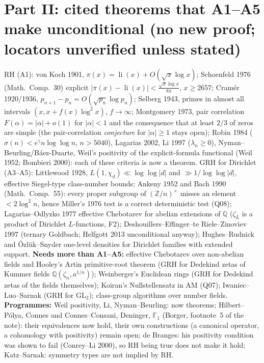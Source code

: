 \documentclass[11pt]{article}
\theoremstyle{definition}\newtheorem{definition}[theorem]{Definition}\newtheorem{remark}[theorem]{Remark}
\begin{document}
\section{Part II: cited theorems that A1--A5 make unconditional (no new proof; locators unverified unless stated)}
RH (A1): von Koch 1901, $\pi(x)=\operatorname{li}(x)+O(\sqrt x\log x)$; Schoenfeld 1976 (Math.\ Comp.\ 30) explicit
$|\pi(x)-\operatorname{li}(x)|<\frac{\sqrt x\log x}{8\pi}$, $x\ge2657$; Cram\'er 1920/1936, $p_{n+1}-p_n=O(\sqrt{p_n}\log p_n)$;
Selberg 1943, primes in almost all intervals $(x,x+f(x)\log^2x)$, $f\to\infty$; Montgomery 1973, pair correlation
$F(\alpha)=|\alpha|+o(1)$ for $|\alpha|<1$ and the consequence that at least $2/3$ of zeros are simple (the pair-correlation
\emph{conjecture} for $|\alpha|\ge1$ stays open); Robin 1984 ($\sigma(n)<e^\gamma n\log\log n$, $n>5040$), Lagarias 2002,
Li 1997 ($\lambda_n\ge0$), Nyman--Beurling/B\'aez-Duarte, Weil's positivity of the explicit-formula functional (Weil 1952;
Bombieri 2000): each of these criteria is now a theorem. GRH for Dirichlet (A3--A5): Littlewood 1928, $L(1,\chi_d)\ll\log\log|d|$
and $\gg1/\log\log|d|$, effective Siegel-type class-number bounds; Ankeny 1952 and Bach 1990 (Math.\ Comp.\ 55): every proper
subgroup of $(\mathbb Z/n)^\times$ misses an element $<2\log^2n$, hence Miller's 1976 test is a correct deterministic test
(Q08); Lagarias--Odlyzko 1977 effective Chebotarev for abelian extensions of $\mathbb Q$ ($\zeta_L$ is a product of Dirichlet
$L$-functions, F2); Deshouillers--Effinger--te Riele--Zinoviev 1997 (ternary Goldbach; Helfgott 2013 unconditional anyway);
Hughes--Rudnick and \"Ozl\"uk--Snyder one-level densities for Dirichlet families with extended support.
\textbf{Needs more than A1--A5:} effective Chebotarev over non-abelian fields and Hooley's Artin primitive-root theorem
(GRH for Dedekind zetas of Kummer fields $\mathbb Q(\zeta_n,a^{1/n})$); Weinberger's Euclidean rings (GRH for Dedekind zetas
of the fields themselves); Koiran's Nullstellensatz in AM (Q07); Iwaniec--Luo--Sarnak (GRH for $\mathrm{GL}_2$); class-group
algorithms over number fields. \textbf{Programmes:} Weil positivity, Li, Nyman--Beurling: now theorems; Hilbert--P\'olya,
Connes and Connes--Consani, Deninger, $\mathbb F_1$ (Borger, footnote~5 of the note): their equivalences now hold, their own
constructions (a canonical operator, a cohomology with positivity) remain open; de Branges: his positivity condition was shown
to fail (Conrey--Li 2000), so RH being true does not make it hold; Katz--Sarnak: symmetry types are not implied by RH.
\end{document}
